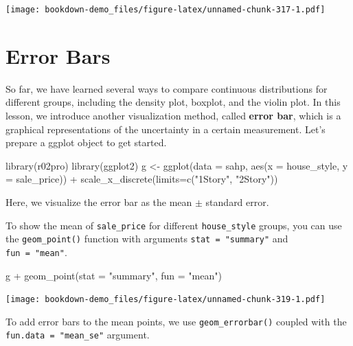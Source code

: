 \documentclass[
]{book}
\newenvironment{Shaded}{\begin{snugshade}}{\end{snugshade}}
\newcommand{\AttributeTok}[1]{\textcolor[rgb]{0.77,0.63,0.00}{#1}}
\newcommand{\FunctionTok}[1]{\textcolor[rgb]{0.00,0.00,0.00}{#1}}
\newcommand{\NormalTok}[1]{#1}
\newcommand{\OtherTok}[1]{\textcolor[rgb]{0.56,0.35,0.01}{#1}}
\newcommand{\SpecialCharTok}[1]{\textcolor[rgb]{0.00,0.00,0.00}{#1}}
\newcommand{\StringTok}[1]{\textcolor[rgb]{0.31,0.60,0.02}{#1}}
\begin{document}
\texttt{[image: bookdown-demo\_files/figure-latex/unnamed-chunk-317-1.pdf]}

\hypertarget{errorbar}{%
\section{Error Bars}\label{errorbar}}

So far, we have learned several ways to compare continuous distributions for different groups, including the density plot, boxplot, and the violin plot. In this lesson, we introduce another visualization method, called \textbf{error bar}, which is a graphical representations of the uncertainty in a certain measurement. Let's prepare a ggplot object to get started.

\begin{Shaded}
\begin{Highlighting}[]
\FunctionTok{library}\NormalTok{(r02pro)}
\FunctionTok{library}\NormalTok{(ggplot2)}
\NormalTok{g }\OtherTok{\textless{}{-}} \FunctionTok{ggplot}\NormalTok{(}\AttributeTok{data =}\NormalTok{ sahp, }\FunctionTok{aes}\NormalTok{(}\AttributeTok{x =}\NormalTok{ house\_style, }\AttributeTok{y =}\NormalTok{ sale\_price)) }\SpecialCharTok{+} 
  \FunctionTok{scale\_x\_discrete}\NormalTok{(}\AttributeTok{limits=}\FunctionTok{c}\NormalTok{(}\StringTok{"1Story"}\NormalTok{, }\StringTok{"2Story"}\NormalTok{))}
\end{Highlighting}
\end{Shaded}

Here, we visualize the error bar as the mean \(\pm\) standard error.

To show the mean of \texttt{sale\_price} for different \texttt{house\_style} groups, you can use the \texttt{geom\_point()} function with arguments \texttt{stat\ =\ "summary"} and \texttt{fun\ =\ "mean"}.

\begin{Shaded}
\begin{Highlighting}[]
\NormalTok{g  }\SpecialCharTok{+} \FunctionTok{geom\_point}\NormalTok{(}\AttributeTok{stat =} \StringTok{"summary"}\NormalTok{, }\AttributeTok{fun =} \StringTok{"mean"}\NormalTok{)}
\end{Highlighting}
\end{Shaded}

\texttt{[image: bookdown-demo\_files/figure-latex/unnamed-chunk-319-1.pdf]}

To add error bars to the mean points, we use \texttt{geom\_errorbar()} coupled with the \texttt{fun.data\ =\ "mean\_se"} argument.
\end{document}
